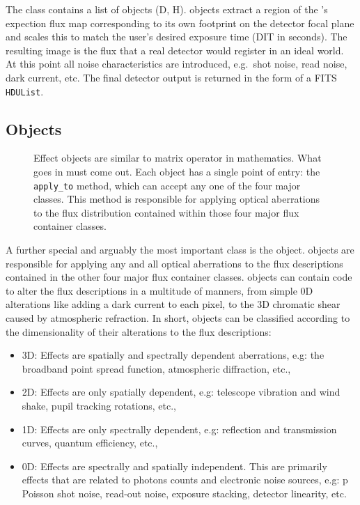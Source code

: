 The \DetectorArray{} class contains a list of \Detector{} objects (D, H).
\Detector{} objects extract a region of the \ImagePlane{}'s expection flux map corresponding to its own footprint on the detector focal plane and scales this to match the user's desired exposure time (DIT in seconds).
The resulting image is the flux that a real detector would register in an ideal world.
At this point all noise characteristics are introduced, e.g.~shot noise, read noise, dark current, etc.
The final detector output is returned in the form of a FITS \lstinline{HDUList}.


\subsection{\Effect{} Objects}
\label{effects-objects}

\begin{figure}
\label{fig-effect}
\caption{Effect objects are similar to matrix operator in mathematics.
What goes in must come out.
Each \Effect{} object has a single point of entry: the \lstinline{apply_to} method, which can accept any one of the four major \ScopeSim{} classes.
This method is responsible for applying optical aberrations to the flux distribution contained within those four major flux container classes.}
\end{figure}

A further special and arguably the most important \ScopeSim{} class is the \Effect{} object.
\Effect{} objects are responsible for applying any and all optical aberrations to the flux descriptions contained in the other four major flux container classes.
\Effect{} objects can contain code to alter the flux descriptions in a multitude of manners, from simple 0D alterations like adding a dark current to each pixel, to the 3D chromatic shear caused by atmospheric refraction.
In short, \Effect{} objects can be classified according to the dimensionality of their alterations to the flux descriptions:

\begin{itemize}
\item 3D: Effects are spatially and spectrally dependent aberrations, e.g: the broadband point spread function, atmospheric diffraction, etc.,

\item 2D: Effects are only spatially dependent, e.g: telescope vibration and wind shake, pupil tracking rotations, etc.,

\item 1D: Effects are only spectrally dependent, e.g: reflection and transmission curves, quantum efficiency, etc.,

\item 0D: Effects are spectrally and spatially independent. This are primarily effects that are related to photons counts and electronic noise sources, e.g: p
Poisson shot noise, read-out noise, exposure stacking, detector linearity, etc.
\end{itemize}

